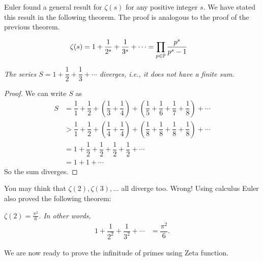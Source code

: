 \documentclass{subfiles}
\begin{document}
	Euler found a general result for $\zeta(s)$ for any positive integer $s$. We have stated this result in the following theorem. The proof is analogous to the proof of the previous theorem.
	\begin{theorem}\slshape
		\begin{align*}
			\zeta(s) & =1+\dfrac{1}{2^s}+\dfrac{1}{3^s}+\cdots=\prod_{p\in\P }\dfrac{p^s}{p^s-1}
		\end{align*}
	\end{theorem}
	
	\begin{theorem}\slshape
		The series $S=1+\dfrac{1}{2}+\dfrac{1}{3}+\cdots$ diverges, i.e., it does not have a finite sum.\label{thm:zeta1div}
	\end{theorem}
	
	\begin{proof}
		We can write $S$ as
		\begin{align*}
			S & =\dfrac11+ \dfrac12+ \left(\dfrac13+\dfrac14\right)+ \left(\dfrac15+\dfrac16+\dfrac17+\dfrac18\right)+\cdots\\
			& > \dfrac11+\dfrac12+ \left(\dfrac14+\dfrac14\right) + \left(\dfrac18+\dfrac18+\dfrac18+\dfrac18\right)+\cdots\\
			& =1+ \dfrac{1}{2}+ \dfrac{1}{2}+ \dfrac{1}{2}+ \dfrac{1}{2}+\cdots\\
			& = 1+1+\cdots
		\end{align*}
		So the sum diverges.
	\end{proof}
	You may think that $\zeta(2),\zeta(3),\ldots$ all diverge too. Wrong! Using calculus Euler also proved the following theorem:
	\begin{theorem}\label{thm:zeta2}\slshape
		$\zeta(2)=\frac{\pi^2}{6}$. In other words,
		\begin{align*}
			1+\dfrac{1}{2^2}+\dfrac{1}{3^2}+\cdots & = \dfrac{\pi^2}{6}.
		\end{align*}
	\end{theorem}
	
	We are now ready to prove the infinitude of primes using Zeta function.
	
\end{document}
